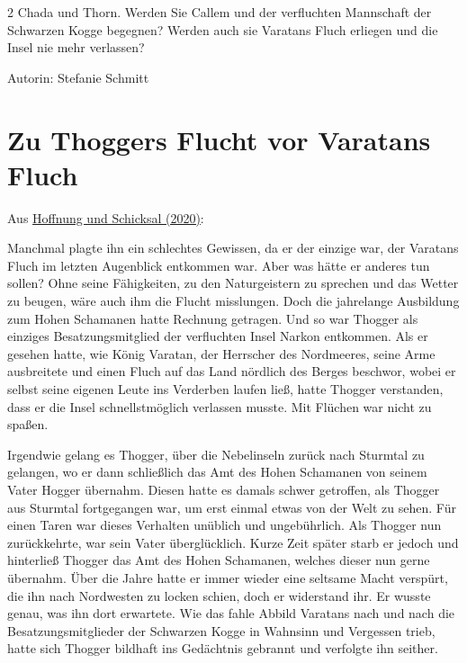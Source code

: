 \documentclass[10pt, a4paper, oneside]{book}
\begin{document}
\begin{multicols}{2}
Chada und Thorn. Werden Sie Callem und der verfluchten Mannschaft der Schwarzen Kogge begegnen? Werden auch sie Varatans Fluch erliegen und die Insel nie mehr verlassen?\bigskip

Autorin: Stefanie Schmitt



\section{Zu Thoggers Flucht vor Varatans Fluch}

\begin{center}
    Aus \hyperref[storytext-2020-hoffnung-und-schicksal]{Hoffnung und Schicksal (2020)}:
\end{center}

Manchmal plagte ihn ein schlechtes Gewissen, da er der einzige war, der Varatans Fluch im letzten Augenblick entkommen war. Aber was hätte er anderes tun sollen? Ohne seine Fähigkeiten, zu den Naturgeistern zu sprechen und das Wetter zu beugen, wäre auch ihm die Flucht misslungen. Doch die jahrelange Ausbildung zum Hohen Schamanen hatte Rechnung getragen. Und so war Thogger als einziges Besatzungsmitglied der verfluchten Insel Narkon entkommen. Als er gesehen hatte, wie König Varatan, der Herrscher des Nordmeeres, seine Arme ausbreitete und einen Fluch auf das Land nördlich des Berges beschwor, wobei er selbst seine eigenen Leute ins Verderben laufen ließ, hatte Thogger verstanden, dass er die Insel schnellstmöglich verlassen musste. Mit Flüchen war nicht zu spaßen.\bigskip

Irgendwie gelang es Thogger, über die Nebelinseln zurück nach Sturmtal zu gelangen, wo er dann schließlich das Amt des Hohen Schamanen von seinem Vater Hogger übernahm. Diesen hatte es damals schwer getroffen, als Thogger aus Sturmtal fortgegangen war, um erst einmal etwas von der Welt zu sehen. Für einen Taren war dieses Verhalten unüblich und ungebührlich. Als Thogger nun zurückkehrte, war sein Vater überglücklich. Kurze Zeit später starb er jedoch und hinterließ Thogger das Amt des Hohen Schamanen, welches dieser nun gerne übernahm. Über die Jahre hatte er immer wieder eine seltsame Macht verspürt, die ihn nach Nordwesten zu locken schien, doch er widerstand ihr. Er wusste genau, was ihn dort erwartete. Wie das fahle Abbild Varatans nach und nach die Besatzungsmitglieder der Schwarzen Kogge in Wahnsinn und Vergessen trieb, hatte sich Thogger bildhaft ins Gedächtnis gebrannt und verfolgte ihn seither.



\end{multicols}
\end{document}
